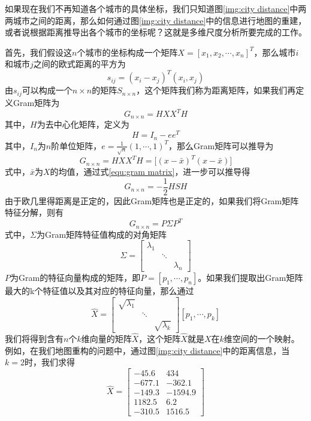 如果现在我们不再知道各个城市的具体坐标，我们只知道图\ref{img:city distance}中两两城市之间的距离，那么如何通过图\ref{img:city distance}中的信息进行地图的重建，或者说根据距离推导出各个城市的坐标呢？这就是多维尺度分析所要完成的工作。

首先，我们假设这$n$个城市的坐标构成一个矩阵$X = [x_1, x_2, \cdots , x_n]^T$，那么城市$i$和城市$j$之间的欧式距离的平方为
\begin{equation}
s_{ij} = (x_i - x_j)^T (x_i, x_j)
\end{equation}
由$s_{ij}$可以构成一个$n\times n$的矩阵$S_{n\times n}$，这个矩阵我们称为距离矩阵，如果我们再定义Gram矩阵为
\begin{equation}
G_{n\times n} = HXX^TH
\end{equation}
其中，$H$为去中心化矩阵，定义为
\begin{equation}
H = I_n - ee^T
\end{equation}
其中，$I_n$为$n$阶单位矩阵，$e = \frac{1}{\sqrt{n}}(1, \cdots, 1)^T$，那么Gram矩阵可以推导为
\begin{equation}
G_{n\times n} = HXX^TH = \bigg[(x - \bar{x})^T (x - \bar{x})\bigg]
\label{equ:gram matrix}
\end{equation}
式中，$\bar{x}$为$X$的均值，通过式\eqref{equ:gram matrix}，进一步可以推导得
\begin{equation}
G_{n\times n} = -\frac{1}{2}HSH
\end{equation}
由于欧几里得距离是正定的，因此Gram矩阵也是正定的，如果我们将Gram矩阵特征分解，则有
\begin{equation}
G_{n\times n} = P\Sigma P^T
\end{equation}
式中，$\Sigma$为Gram矩阵特征值构成的对角矩阵
\begin{equation}
\Sigma = \left[
\begin{array}{ccc}
\lambda_1 & &\\
&\ddots&\\
&&\lambda_n
\end{array}
\right]
\end{equation}
$P$为Gram的特征向量构成的矩阵，即$P = [p_1, \cdots, p_n]$。如果我们提取出Gram矩阵最大的k个特征值以及其对应的特征向量，那么通过
\begin{equation}
\hat{X} = \left[
\begin{array}{ccc}
\sqrt{\lambda_1} & &\\
&\ddots&\\
&&\sqrt{\lambda_k}
\end{array}
\right] 
[p_1, \cdots, p_k]
\end{equation}
我们将得到含有$n$个$k$维向量的矩阵$\hat{X}$，这个矩阵$\hat{X}$就是$X$在$k$维空间的一个映射。例如，在我们地图重构的问题中，通过图\ref{img:city distance}中的距离信息，当$k=2$时，我们求得
\begin{equation}
\hat{X} = \left[
\begin{array}{cc}
-45.6 & 434 \\
-677.1 & -362.1 \\
-149.3 & -1594.9 \\
1182.5 & 6.2 \\
-310.5 &1516.5
\end{array}
\right]
\end{equation}

